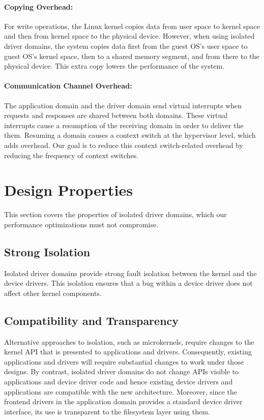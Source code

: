 \paragraph{Copying Overhead: } For write operations, the Linux kernel copies
data from user space to kernel space and then from kernel space to the
physical device. However, when using isolated driver domains, the system copies data
first from the guest OS's user space to guest OS's kernel space, then
to a shared memory segment, and from there to the physical
device. This extra copy lowers the performance of the system.

\paragraph{Communication Channel Overhead: } The application domain and
the driver domain send virtual interrupts when requests and responses
are shared between both domains. These virtual interrupts cause
a resumption of the receiving domain in order to deliver the them.  Resuming
a domain causes a context switch at the hypervisor level, which adds
overhead. Our goal is to reduce this context switch-related overhead by
reducing the frequency of context switches.

\section{Design Properties}
\label{sec:properties}
This section covers the properties of isolated driver domains, which our
performance optimizations must not compromise.

\subsection*{Strong Isolation}
Isolated driver domains provide strong fault isolation between the 
kernel and the device drivers. This isolation ensures that a bug within 
a device driver does not affect other kernel components.

\subsection*{Compatibility and Transparency} 
Alternative approaches to isolation, such as microkernels, require
changes to the kernel API that is presented to applications and drivers.
Consequently, existing applications and drivers will require substantial
changes to work under those designs.
By contrast, isolated driver domains do not change APIs visible to
applications and device driver code and hence existing device drivers
and applications are compatible with the new architecture.
Moreover, since the frontend drivers in the application domain
provides a standard device driver interface, its use is transparent
to the filesystem layer using them.



